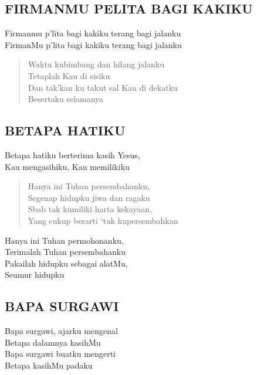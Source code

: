 \subsection{FIRMANMU PELITA BAGI KAKIKU} 
\begin{altverse}
Firmanmu p’lita bagi kakiku terang bagi jalanku\\ 
FirmanMu p’lita bagi kakiku terang bagi jalanku 
\end{altverse}

\begin{verse}
Waktu kubimbang dan hilang jalanku \\
Tetaplah Kau di sisiku \\
Dan tak’kan ku takut sal Kau di dekatku\\ 
Besertaku selamanya 
\end{verse}


\subsection{BETAPA HATIKU} 
\begin{altverse}
Betapa hatiku berterima kasih Yesus,\\ 
Kau mengasihiku, Kau memilikiku
\end{altverse} 

\begin{verse}
Hanya ini Tuhan persembahanku, \\
Segenap hidupku jiwa dan ragaku \\
Sbab tak kumiliki harta kekayaan, \\
Yang cukup berarti ‘tuk kupersembahkan
\end{verse} 

\begin{altverse}
Hanya ini Tuhan permohonanku,\\ 
Terimalah Tuhan persembahanku \\
Pakailah hidupku sebagai alatMu,\\ 
Seumur hidupku
\end{altverse} 

\subsection{BAPA SURGAWI} 
\begin{altverse}
Bapa surgawi, ajarku mengenal \\
Betapa dalamnya kasihMu \\
Bapa surgawi buatku mengerti \\
Betapa kasihMu padaku
\end{altverse} 

